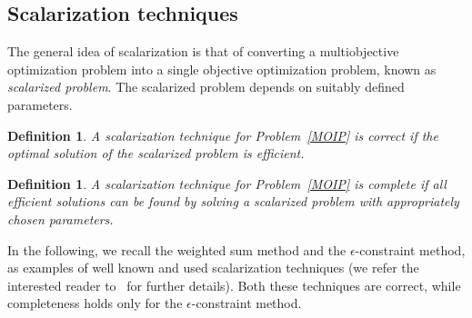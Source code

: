 \documentclass[preprint,12pt]{elsarticle}
\newtheorem{definition}[theorem]{Definition}
\newtheorem{assumption}[theorem]{Assumption}
\begin{document}

\subsection{Scalarization techniques}\label{sec:scal}
The general idea of scalarization is that of converting a multiobjective optimization problem into a single objective optimization problem, known as \emph{scalarized problem}.
The scalarized problem depends on suitably defined parameters.
\begin{definition}\label{def:correct}
 A scalarization technique for Problem~\eqref{MOIP} is correct if the optimal solution of the scalarized problem is efficient.
\end{definition}
\begin{definition}\label{def:complete}
 A scalarization technique for Problem~\eqref{MOIP} is complete if all efficient solutions can be found by solving a scalarized problem with appropriately chosen parameters.
\end{definition}
In the following, we recall the weighted sum method and the $\epsilon$-constraint method, as examples of well known and used scalarization techniques (we refer the interested reader
to~\cite{ehrgott2005multicriteria, miettinen1999nonlinear} for further details).
Both these techniques are correct, while completeness holds only for the $\epsilon$-constraint method.
\end{document}
